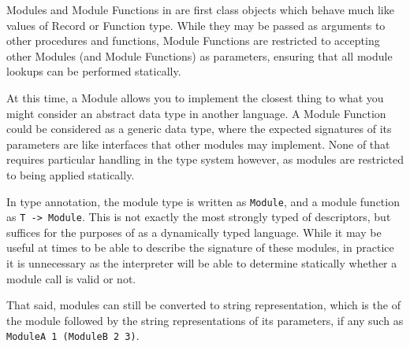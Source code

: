 Modules and Module Functions in \Trilogy{} are first class objects which behave much
like values of Record or Function type. While they may be passed as arguments
to other procedures and functions, Module Functions are restricted to accepting other
Modules (and Module Functions) as parameters, ensuring that all module lookups can be
performed statically.

At this time, a Module allows you to implement the closest thing to what you might
consider an abstract data type in another language. A Module Function could be considered
as a generic data type, where the expected signatures of its parameters are like interfaces that
other modules may implement. None of that requires particular handling in the type system
however, as modules are restricted to being applied statically.

In type annotation, the module type is written as \texttt{Module}, and a module function
as \texttt{T -> Module}. This is not exactly the most strongly typed of descriptors,
but suffices for the purposes of \Trilogy{} as a dynamically typed language. While it may
be useful at times to be able to describe the signature of these modules, in practice it
is unnecessary as the interpreter will be able to determine statically whether a module
call is valid or not.

That said, modules can still be converted to string representation, which is the
of the module followed by the string representations of its parameters, if any
such as \texttt{ModuleA 1 (ModuleB 2 3)}.
